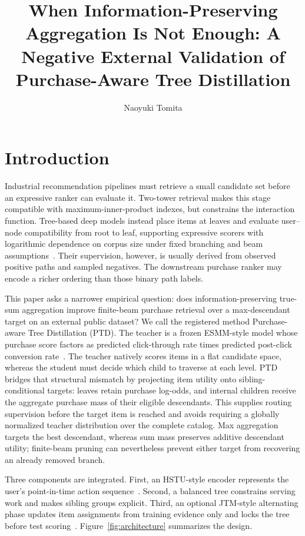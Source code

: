 \documentclass[sigconf,natbib=true]{acmart}
\title{When Information-Preserving Aggregation Is Not Enough: A Negative External Validation of Purchase-Aware Tree Distillation}
\author{Naoyuki Tomita}
\affiliation{%
    \institution{X Pipelines Co., Ltd.}
    \city{Ho Chi Minh City}
    \country{Vietnam}
  }
\affiliation{\institution{Affiliation withheld for anonymous review}}
\newcommand{\ptd}{\textsc{PTD}}
\begin{document}
\maketitle

\section{Introduction}
Industrial recommendation pipelines must retrieve a small candidate set before an expressive ranker can evaluate it. Two-tower retrieval makes this stage compatible with maximum-inner-product indexes, but constrains the interaction function. Tree-based deep models instead place items at leaves and evaluate user--node compatibility from root to leaf, supporting expressive scorers with logarithmic dependence on corpus size under fixed branching and beam assumptions~\citep{zhu2018tdm}. Their supervision, however, is usually derived from observed positive paths and sampled negatives. The downstream purchase ranker may encode a richer ordering than those binary path labels.

This paper asks a narrower empirical question: does information-preserving true-sum aggregation improve finite-beam purchase retrieval over a max-descendant target on an external public dataset? We call the registered method Purchase-aware Tree Distillation (\ptd). The teacher is a frozen ESMM-style model whose purchase score factors as predicted click-through rate times predicted post-click conversion rate~\citep{ma2018esmm}. The teacher natively scores items in a flat candidate space, whereas the student must decide which child to traverse at each level. \ptd{} bridges that structural mismatch by projecting item utility onto sibling-conditional targets: leaves retain purchase log-odds, and internal children receive the aggregate purchase mass of their eligible descendants. This supplies routing supervision before the target item is reached and avoids requiring a globally normalized teacher distribution over the complete catalog. Max aggregation targets the best descendant, whereas sum mass preserves additive descendant utility; finite-beam pruning can nevertheless prevent either target from recovering an already removed branch.

Three components are integrated. First, an HSTU-style encoder represents the user's point-in-time action sequence~\citep{zhai2024hstu}. Second, a balanced tree constrains serving work and makes sibling groups explicit. Third, an optional JTM-style alternating phase updates item assignments from training evidence only and locks the tree before test scoring~\citep{zhu2019jtm}. Figure~\ref{fig:architecture} summarizes the design.
\end{document}
